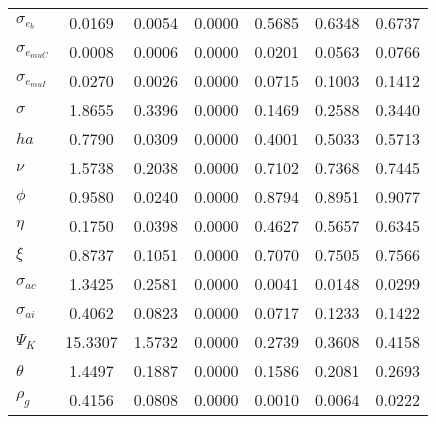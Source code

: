 \begin{center}
\begin{longtable}{lcccccc}
$ \sigma_{{e_b}}       $	 & 	          0.0169	 & 	          0.0054	 & 	          0.0000	 & 	          0.5685	 & 	          0.6348	 & 	          0.6737 \\ 
$ \sigma_{{e_{muC}}}   $	 & 	          0.0008	 & 	          0.0006	 & 	          0.0000	 & 	          0.0201	 & 	          0.0563	 & 	          0.0766 \\ 
$ \sigma_{{e_{muI}}}   $	 & 	          0.0270	 & 	          0.0026	 & 	          0.0000	 & 	          0.0715	 & 	          0.1003	 & 	          0.1412 \\ 
$ {\sigma}             $	 & 	          1.8655	 & 	          0.3396	 & 	          0.0000	 & 	          0.1469	 & 	          0.2588	 & 	          0.3440 \\ 
$ {ha}                 $	 & 	          0.7790	 & 	          0.0309	 & 	          0.0000	 & 	          0.4001	 & 	          0.5033	 & 	          0.5713 \\ 
$ \nu                  $	 & 	          1.5738	 & 	          0.2038	 & 	          0.0000	 & 	          0.7102	 & 	          0.7368	 & 	          0.7445 \\ 
$ {\phi}               $	 & 	          0.9580	 & 	          0.0240	 & 	          0.0000	 & 	          0.8794	 & 	          0.8951	 & 	          0.9077 \\ 
$ {\eta}               $	 & 	          0.1750	 & 	          0.0398	 & 	          0.0000	 & 	          0.4627	 & 	          0.5657	 & 	          0.6345 \\ 
$ \xi                  $	 & 	          0.8737	 & 	          0.1051	 & 	          0.0000	 & 	          0.7070	 & 	          0.7505	 & 	          0.7566 \\ 
$ {\sigma_{ac}}        $	 & 	          1.3425	 & 	          0.2581	 & 	          0.0000	 & 	          0.0041	 & 	          0.0148	 & 	          0.0299 \\ 
$ {\sigma_{ai}}        $	 & 	          0.4062	 & 	          0.0823	 & 	          0.0000	 & 	          0.0717	 & 	          0.1233	 & 	          0.1422 \\ 
$ {\Psi_{K}}           $	 & 	         15.3307	 & 	          1.5732	 & 	          0.0000	 & 	          0.2739	 & 	          0.3608	 & 	          0.4158 \\ 
$ {\theta}             $	 & 	          1.4497	 & 	          0.1887	 & 	          0.0000	 & 	          0.1586	 & 	          0.2081	 & 	          0.2693 \\ 
$ {\rho_g}             $	 & 	          0.4156	 & 	          0.0808	 & 	          0.0000	 & 	          0.0010	 & 	          0.0064	 & 	          0.0222 \\ 

\end{longtable}
\end{center}
